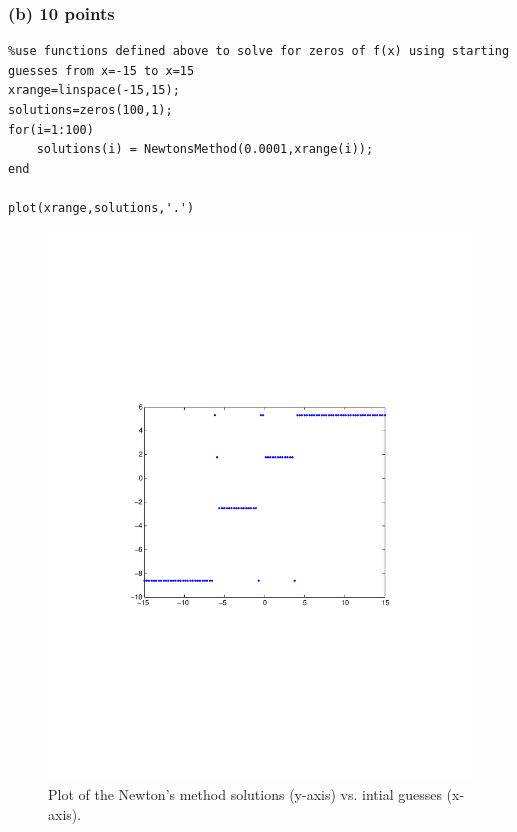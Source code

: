 \documentclass[11pt]{article}
\begin{document}
\subsubsection*{(b) 10 points}
\begin{verbatim}
%use functions defined above to solve for zeros of f(x) using starting guesses from x=-15 to x=15
xrange=linspace(-15,15);
solutions=zeros(100,1);
for(i=1:100)
    solutions(i) = NewtonsMethod(0.0001,xrange(i));
end

plot(xrange,solutions,'.')
\end{verbatim}

\begin{figure}[htbp]
	\centerline{\includegraphics[width=1\textwidth]{newtonSolution.pdf}}
	\caption{\label{p1}%
	Plot of the Newton's method solutions (y-axis) vs. intial guesses (x-axis).}
\end{figure}
\end{document}
